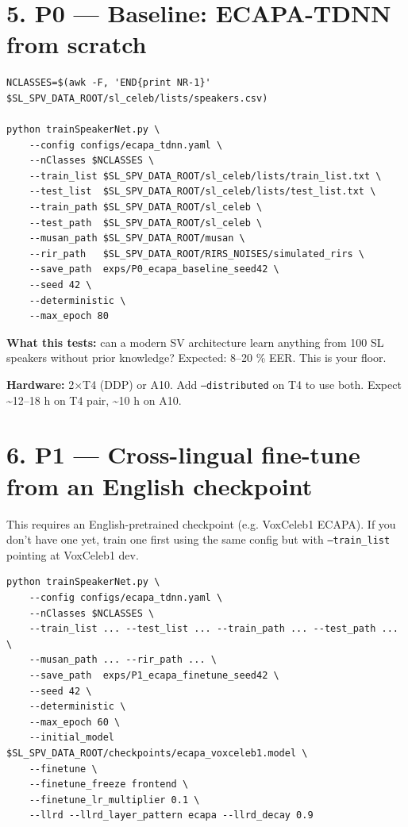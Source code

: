 \documentclass[10pt,a4paper]{article}
\begin{document}
\section*{5. P0 --- Baseline: ECAPA-TDNN from scratch}


\begin{Verbatim}[fontsize=\small,frame=single,framesep=4pt]
NCLASSES=$(awk -F, 'END{print NR-1}' $SL_SPV_DATA_ROOT/sl_celeb/lists/speakers.csv)

python trainSpeakerNet.py \
    --config configs/ecapa_tdnn.yaml \
    --nClasses $NCLASSES \
    --train_list $SL_SPV_DATA_ROOT/sl_celeb/lists/train_list.txt \
    --test_list  $SL_SPV_DATA_ROOT/sl_celeb/lists/test_list.txt \
    --train_path $SL_SPV_DATA_ROOT/sl_celeb \
    --test_path  $SL_SPV_DATA_ROOT/sl_celeb \
    --musan_path $SL_SPV_DATA_ROOT/musan \
    --rir_path   $SL_SPV_DATA_ROOT/RIRS_NOISES/simulated_rirs \
    --save_path  exps/P0_ecapa_baseline_seed42 \
    --seed 42 \
    --deterministic \
    --max_epoch 80
\end{Verbatim}


\textbf{What this tests:} can a modern SV architecture learn anything from 100 SL speakers without prior knowledge? Expected: 8--20 \% EER. This is your floor.

\textbf{Hardware:} 2$\times$T4 (DDP) or A10. Add \texttt{--distributed} on T4 to use both. Expect \textasciitilde{}12--18 h on T4 pair, \textasciitilde{}10 h on A10.

\section*{6. P1 --- Cross-lingual fine-tune from an English checkpoint}

This requires an English-pretrained checkpoint (e.g. VoxCeleb1 ECAPA). If you don't have one yet, train one first using the same config but with \texttt{--train\_list} pointing at VoxCeleb1 dev.


\begin{Verbatim}[fontsize=\small,frame=single,framesep=4pt]
python trainSpeakerNet.py \
    --config configs/ecapa_tdnn.yaml \
    --nClasses $NCLASSES \
    --train_list ... --test_list ... --train_path ... --test_path ... \
    --musan_path ... --rir_path ... \
    --save_path  exps/P1_ecapa_finetune_seed42 \
    --seed 42 \
    --deterministic \
    --max_epoch 60 \
    --initial_model $SL_SPV_DATA_ROOT/checkpoints/ecapa_voxceleb1.model \
    --finetune \
    --finetune_freeze frontend \
    --finetune_lr_multiplier 0.1 \
    --llrd --llrd_layer_pattern ecapa --llrd_decay 0.9
\end{Verbatim}
\end{document}

